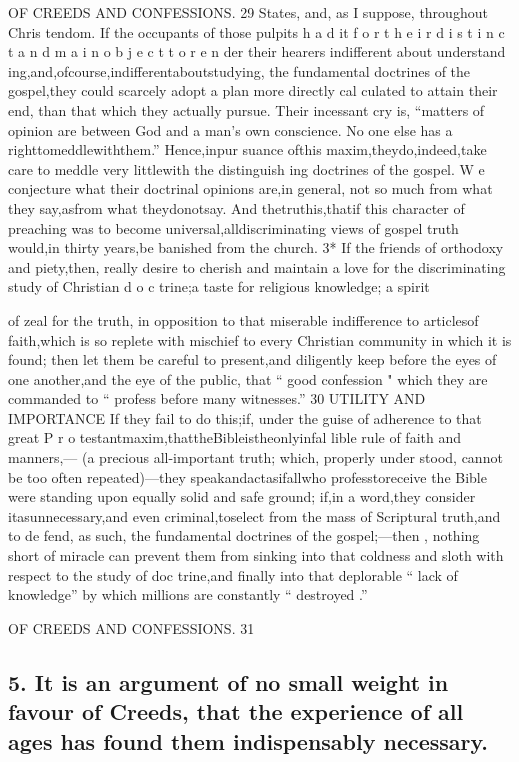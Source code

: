 \documentclass[
]{book}
\begin{document}
OF CREEDS AND CONFESSIONS. 29
States, and, as I suppose, throughout Chris tendom. If the occupants of those pulpits h a d it f o r t h e i r d i s t i n c t a n d m a i n o b j e c t t o r e n der their hearers indifferent about understand
ing,and,ofcourse,indifferentaboutstudying, the fundamental doctrines of the gospel,they
could scarcely adopt a plan more directly cal
culated to attain their end, than that which
they actually pursue. Their incessant cry is,
``matters of opinion are between God and a man's own conscience. No one else has a
righttomeddlewiththem.'' Hence,inpur
suance ofthis maxim,theydo,indeed,take
care to meddle very littlewith the distinguish
ing doctrines of the gospel. W e conjecture what their doctrinal opinions are,in general,
not so much from what they say,asfrom what theydonotsay. And thetruthis,thatif
this character of preaching was to become universal,alldiscriminating views of gospel truth would,in thirty years,be banished from the church.
3*
If the friends of orthodoxy and piety,then, really desire to cherish and maintain a love for the discriminating study of Christian d o c trine;a taste for religious knowledge; a spirit

of zeal for the truth, in opposition to that miserable indifference to articlesof faith,which is so replete with mischief to every Christian community in which it is found; then let them be careful to present,and diligently keep before the eyes of one another,and the eye of the public, that `` good confession "
which they are commanded to `` profess before many witnesses.''
30 UTILITY AND IMPORTANCE
If they fail to do this;if,
under the guise of adherence to that great P r o testantmaxim,thattheBibleistheonlyinfal lible rule of faith and manners,--- (a precious all-important truth; which, properly under stood, cannot be too often repeated)---they speakandactasifallwho professtoreceive the Bible were standing upon equally solid and safe ground; if,in a word,they consider itasunnecessary,and even criminal,toselect from the mass of Scriptural truth,and to de fend, as such, the fundamental doctrines of the gospel;---then , nothing short of miracle can prevent them from sinking into that coldness and sloth with respect to the study of doc
trine,and finally into that deplorable `` lack of
knowledge'' by which millions are constantly `` destroyed .''

OF CREEDS AND CONFESSIONS. 31

\hypertarget{it-is-an-argument-of-no-small-weight-in-favour-of-creeds-that-the-experience-of-all-ages-has-found-them-indispensably-necessary.}{%
\subsection{5. It is an argument of no small weight in favour of Creeds, that the experience of all ages has found them indispensably necessary.}\label{it-is-an-argument-of-no-small-weight-in-favour-of-creeds-that-the-experience-of-all-ages-has-found-them-indispensably-necessary.}}
\end{document}
